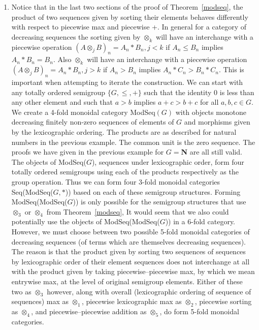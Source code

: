 \documentclass{tac}
\begin{document}
{\begin{enumerate}
\item
Notice that in the last two sections of the proof of Theorem~\ref{modseq}, the 
product of two sequences given by sorting their elements
behaves differently with respect to piecewise max and piecewise +. In general for a category of decreasing sequences
the sorting given by $\otimes_k$ will have an interchange with a piecewise operation ${(A\otimes_j B)}_n = A_n*B_n, j < k$
if $ A_n \le B_n $ 
implies $A_n*B_n = B_n.$ Also $\otimes_k$ will have an interchange with a  piecewise operation ${(A\otimes_j B)}_n = A_n*B_n, j > k$
if $ A_n > B_n $ 
implies $A_n*C_n > B_n*C_n.$
This is important when attempting to
 iterate the construction.
 We can start with any totally ordered semigroup $\{G,\le, +\}$ such that the identity
0 is less than any other element and such that $ a > b $ 
implies $a+c > b+c$ for all $a,b,c \in G.$ 
We create a 4-fold monoidal category ModSeq$(G)$ with objects monotone decreasing 
finitely non-zero sequences of elements of $G$ and morphisms given by the lexicographic ordering. 
The products are as described for natural numbers in the previous example.  The common unit is the zero sequence.   
The proofs we have given in 
the previous example for $G = ${\bf N} are all still valid.  The objects of ModSeq($G$), sequences under lexicographic order,
 form four totally ordered semigroups
using each of the products respectively as the group operation. Thus we can form
four 3-fold monoidal categories Seq(ModSeq($G,*$)) based on each of these semigroup structures. 
Forming ModSeq(ModSeq($G$)) is only possible for the semigroup structures that use 
$\otimes_3$ or $\otimes_4$ from Theorem~\ref{modseq}, It would seem that we also could potentially use the objects of
ModSeq(ModSeq($G$)) in a 6-fold category. However, we must choose between two possible 5-fold monoidal categories
 of decreasing sequences (of terms which are themselves decreasing sequences).
The reason is that the product given by sorting two sequences of sequences by lexicographic order of their element sequences
does not interchange at all with the product given by taking piecewise--piecewise max, by which we mean
entrywise max, at the level of original semigroup elements. Either of these two as $\otimes_3$ however,
along with overall (lexicographic ordering of sequence of sequences) max as $\otimes_1$, piecewise lexicographic max as $\otimes_2$, 
piecewise sorting as $\otimes_4$, and piecewise--piecewise addition as $\otimes_5$,
do form 5-fold monoidal categories.





\end{enumerate}}
\end{document}
